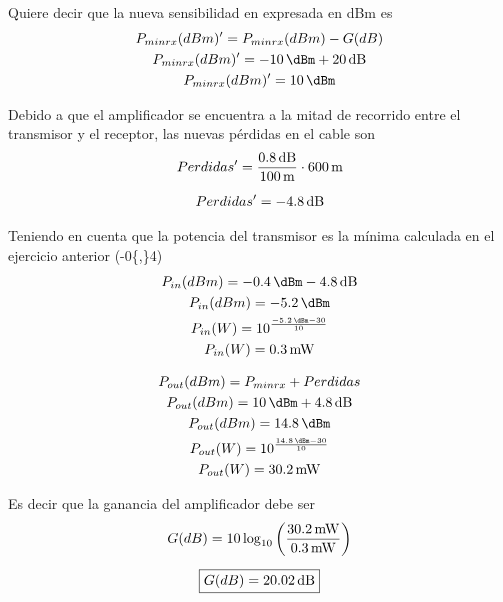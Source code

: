 \documentclass[11pt,a4paper]{article}
\begin{document}
Quiere decir que la nueva sensibilidad en expresada en dBm es
\[
    \begin{gathered}
        P_{minrx}(dBm)' = P_{minrx}(dBm) - G(dB) \\
        P_{minrx}(dBm)' = \SI{-10}{\dBm} + \SI{20}{\decibel} \\
        P_{minrx}(dBm)' = \SI{10}{\dBm}
    \end{gathered}
\]

Debido a que el amplificador se encuentra a la mitad de recorrido entre el transmisor y el
receptor, las nuevas pérdidas en el cable son
\[
    \begin{gathered}
        Perdidas' = \frac{\SI{0{,}8}{\decibel}}{\SI{100}{\metre}} \cdot
        \SI{600}{\metre}\\[2mm]
        Perdidas' = \SI{-4{,}8}{\decibel}
    \end{gathered}
\]

Teniendo en cuenta que la potencia del transmisor es la mínima calculada en el ejercicio
anterior (\SI{-0{,}4}{\dBm})
\[
    \begin{gathered}
        P_{in}(dBm) = \SI{-0{,}4}{\dBm} - \SI{4{,}8}{\decibel} \\
        P_{in}(dBm) = \SI{-5{,}2}{\dBm} \\
        P_{in}(W) = 10^{\frac{\SI{-5{,}2}{\dBm} - 30}{10}} \\
        P_{in}(W) = \SI{0{,}3}{\milli\watt}
    \end{gathered}
\]

\[
    \begin{gathered}
        P_{out}(dBm) = P_{minrx} + Perdidas \\
        P_{out}(dBm) = \SI{10}{\dBm} + \SI{4{,}8}{\decibel}  \\
        P_{out}(dBm) = \SI{14{,}8}{\dBm} \\
        P_{out}(W) = 10^{\frac{\SI{14{,}8}{\dBm} - 30}{10}} \\
        P_{out}(W) = \SI{30{,}2}{\milli\watt}
    \end{gathered}
\]

Es decir que la ganancia del amplificador debe ser
\[
    \begin{gathered}
        G(dB) = 10\log_{10}
        \left(\frac{\SI{30{,}2}{\milli\watt}}{\SI{0{,}3}{\milli\watt}}\right) \\[2mm]
        \boxed{G(dB) = \SI{20{,}02}{\decibel}}
    \end{gathered}
\]

\end{document}
